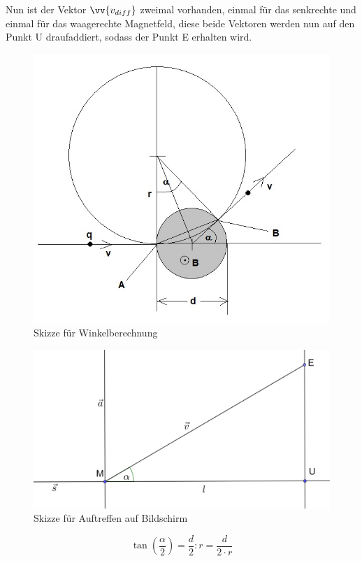 Nun ist der Vektor $\vv{v_{diff}}$ zweimal vorhanden, einmal für das senkrechte und einmal für das waagerechte Magnetfeld, diese beide Vektoren werden nun auf den Punkt U draufaddiert, sodass der Punkt E erhalten wird.
\begin{figure}
    \centering
    \includegraphics[width=.75\textwidth]{fig/elektronenstrahl-ablenkung_101.jpg}
    \caption{Skizze für Winkelberechnung}
    \label{fig:ausBlog}
\end{figure}

\begin{figure}
    \centering
    \includegraphics[width=.75\textwidth]{fig/Bildschirm_Skizze.png}
    \caption{Skizze für Auftreffen auf Bildschirm}
    \label{fig:Schirm}
\end{figure}

\begin{equation}
    \label{eq:tan}
    \tan(\frac{\alpha}{2}) = \frac{d}{2}:r = \frac{d}{2 \cdot r}
\end{equation}

